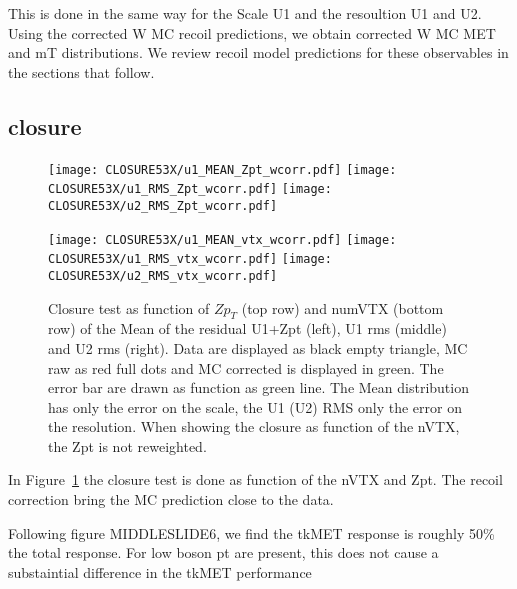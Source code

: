 \documentclass[41pt,a4paper,oneside]{report}
\begin{document}
This is done in the same way for the Scale U1 and the resoultion U1 and U2.
Using the corrected W MC recoil predictions, we obtain corrected W MC MET and mT distributions.
We review recoil model predictions for these observables in the sections that follow. 


\subsection{closure}

\begin{figure}[h!]
  \begin{center}
    \texttt{[image: CLOSURE53X/u1\_MEAN\_Zpt\_wcorr.pdf]}
    \texttt{[image: CLOSURE53X/u1\_RMS\_Zpt\_wcorr.pdf]}
    \texttt{[image: CLOSURE53X/u2\_RMS\_Zpt\_wcorr.pdf]}

    \texttt{[image: CLOSURE53X/u1\_MEAN\_vtx\_wcorr.pdf]}
    \texttt{[image: CLOSURE53X/u1\_RMS\_vtx\_wcorr.pdf]}
    \texttt{[image: CLOSURE53X/u2\_RMS\_vtx\_wcorr.pdf]}
    \caption{ 
      Closure test as function of $Zp_{T}$ (top row) and numVTX (bottom row) of the Mean of the residual U1+Zpt (left), U1 rms (middle) and U2 rms (right). Data are displayed as black empty triangle, MC raw as red full dots and MC corrected is displayed in green.
      The error bar are drawn as function as green line. The Mean distribution has only the error on the scale, the U1 (U2) RMS only the error on the resolution. When showing the closure as function of the nVTX, the Zpt is not reweighted.
{\color{magenta}{Need to split the control and target sample.} {\color{blue}{plot oder than OCT6}}}
    }
    \label{fig:ClosureApplication}
  \end{center}
\end{figure}

In Figure~\ref{fig:ClosureApplication} the closure test is done as function of the nVTX and Zpt.
The recoil correction bring the MC prediction close to the data.

{\color{magenta}{HERE add the plots the UPrallal/PtZ and RMS Uparall/PtZ}}

Following figure MIDDLESLIDE6, we find the tkMET response is roughly 50\% the total
response. For low boson pt are present, this does not cause a substaintial
difference in the tkMET performance 
\end{document}
